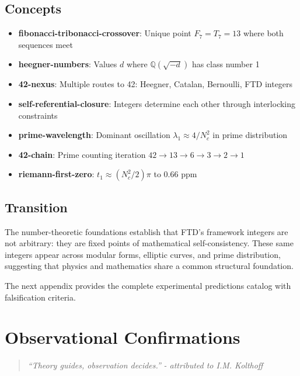 \documentclass[
  11pt,
  letterpaper,
  twoside,
  openany]{book}
\makeatletter
\providecommand{\tightlist}{%
  \setlength{\itemsep}{0pt}\setlength{\parskip}{0pt}}
\let\orig@section\section
\renewcommand{\section}{\needspace{8\baselineskip}\orig@section}
\makeatother
\begin{document}
\section{Concepts}\label{concepts-2}

\begin{itemize}
\tightlist
\item
  \textbf{fibonacci-tribonacci-crossover}: Unique point
  \(F_7 = T_7 = 13\) where both sequences meet
\item
  \textbf{heegner-numbers}: Values \(d\) where \(\mathbb{Q}(\sqrt{-d})\)
  has class number 1
\item
  \textbf{42-nexus}: Multiple routes to 42: Heegner, Catalan, Bernoulli,
  FTD integers
\item
  \textbf{self-referential-closure}: Integers determine each other
  through interlocking constraints
\item
  \textbf{prime-wavelength}: Dominant oscillation
  \(\lambda_1 \approx 4/N_c^2\) in prime distribution
\item
  \textbf{42-chain}: Prime counting iteration
  \(42 \to 13 \to 6 \to 3 \to 2 \to 1\)
\item
  \textbf{riemann-first-zero}: \(t_1 \approx (N_c^2/2)\pi\) to 0.66 ppm
\end{itemize}

\section{Transition}\label{transition-2}

The number-theoretic foundations establish that FTD's framework integers
are not arbitrary: they are fixed points of mathematical
self-consistency. These same integers appear across modular forms,
elliptic curves, and prime distribution, suggesting that physics and
mathematics share a common structural foundation.

The next appendix provides the complete experimental predictions catalog
with falsification criteria.

\chapter{Observational Confirmations}\label{sec-obs-confirm}

\begin{quote}
\emph{``Theory guides, observation decides.''} \emph{- attributed to
I.M. Kolthoff}
\end{quote}
\end{document}
